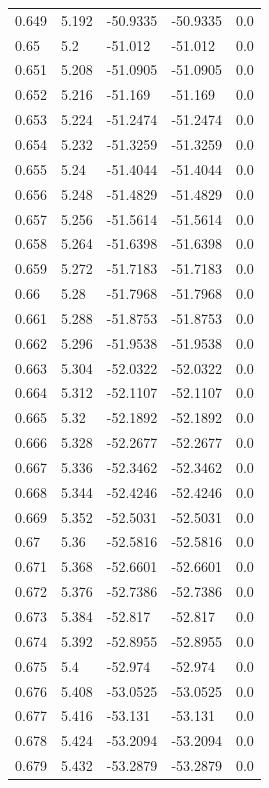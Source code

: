 \begin{table}[H]
\begin{tabular}{lllll}
0.649 & 5.192 & -50.9335 & -50.9335 & 0.0 \\
0.65 & 5.2 & -51.012 & -51.012 & 0.0 \\
0.651 & 5.208 & -51.0905 & -51.0905 & 0.0 \\
0.652 & 5.216 & -51.169 & -51.169 & 0.0 \\
0.653 & 5.224 & -51.2474 & -51.2474 & 0.0 \\
0.654 & 5.232 & -51.3259 & -51.3259 & 0.0 \\
0.655 & 5.24 & -51.4044 & -51.4044 & 0.0 \\
0.656 & 5.248 & -51.4829 & -51.4829 & 0.0 \\
0.657 & 5.256 & -51.5614 & -51.5614 & 0.0 \\
0.658 & 5.264 & -51.6398 & -51.6398 & 0.0 \\
0.659 & 5.272 & -51.7183 & -51.7183 & 0.0 \\
0.66 & 5.28 & -51.7968 & -51.7968 & 0.0 \\
0.661 & 5.288 & -51.8753 & -51.8753 & 0.0 \\
0.662 & 5.296 & -51.9538 & -51.9538 & 0.0 \\
0.663 & 5.304 & -52.0322 & -52.0322 & 0.0 \\
0.664 & 5.312 & -52.1107 & -52.1107 & 0.0 \\
0.665 & 5.32 & -52.1892 & -52.1892 & 0.0 \\
0.666 & 5.328 & -52.2677 & -52.2677 & 0.0 \\
0.667 & 5.336 & -52.3462 & -52.3462 & 0.0 \\
0.668 & 5.344 & -52.4246 & -52.4246 & 0.0 \\
0.669 & 5.352 & -52.5031 & -52.5031 & 0.0 \\
0.67 & 5.36 & -52.5816 & -52.5816 & 0.0 \\
0.671 & 5.368 & -52.6601 & -52.6601 & 0.0 \\
0.672 & 5.376 & -52.7386 & -52.7386 & 0.0 \\
0.673 & 5.384 & -52.817 & -52.817 & 0.0 \\
0.674 & 5.392 & -52.8955 & -52.8955 & 0.0 \\
0.675 & 5.4 & -52.974 & -52.974 & 0.0 \\
0.676 & 5.408 & -53.0525 & -53.0525 & 0.0 \\
0.677 & 5.416 & -53.131 & -53.131 & 0.0 \\
0.678 & 5.424 & -53.2094 & -53.2094 & 0.0 \\
0.679 & 5.432 & -53.2879 & -53.2879 & 0.0 \\

\end{tabular}
\end{table}
